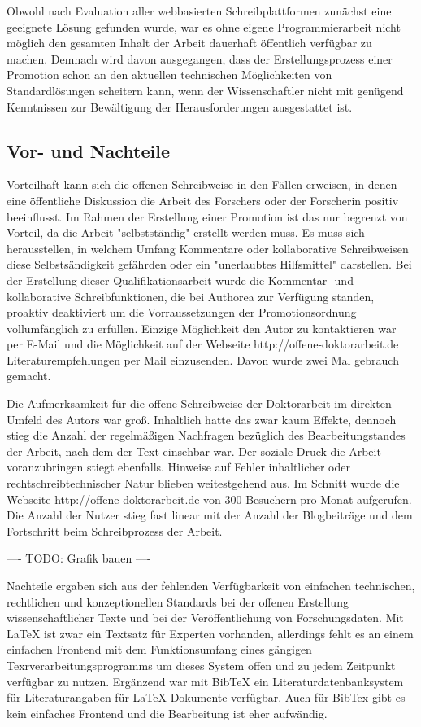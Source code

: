 Obwohl nach Evaluation aller webbasierten Schreibplattformen zunächst eine geeignete Lösung gefunden wurde, war es ohne eigene Programmierarbeit nicht möglich den gesamten Inhalt der Arbeit dauerhaft öffentlich verfügbar zu machen. Demnach wird davon ausgegangen, dass der Erstellungsprozess einer Promotion schon an den aktuellen technischen Möglichkeiten von Standardlösungen scheitern kann, wenn der Wissenschaftler nicht mit genügend Kenntnissen zur Bewältigung der Herausforderungen ausgestattet ist.

\subsection{Vor- und Nachteile}

Vorteilhaft kann sich die offenen Schreibweise in den Fällen erweisen, in denen eine öffentliche Diskussion die Arbeit des Forschers oder der Forscherin positiv beeinflusst. Im Rahmen der Erstellung einer Promotion ist das nur begrenzt von Vorteil, da die Arbeit "selbstständig" erstellt werden muss. Es muss sich herausstellen, in welchem Umfang Kommentare oder kollaborative Schreibweisen diese Selbstsändigkeit gefährden oder ein "unerlaubtes Hilfsmittel" darstellen. Bei der Erstellung dieser Qualifikationsarbeit wurde die Kommentar- und kollaborative Schreibfunktionen, die bei Authorea zur Verfügung standen, proaktiv deaktiviert um die Vorraussetzungen der Promotionsordnung vollumfänglich zu erfüllen. Einzige Möglichkeit den Autor zu kontaktieren war per E-Mail und die Möglichkeit auf der Webseite http://offene-doktorarbeit.de Literaturempfehlungen per Mail einzusenden. Davon wurde zwei Mal gebrauch gemacht.

Die Aufmerksamkeit für die offene Schreibweise der Doktorarbeit im direkten Umfeld des Autors war groß. Inhaltlich hatte das zwar kaum Effekte, dennoch stieg die Anzahl der regelmäßigen Nachfragen bezüglich des Bearbeitungstandes der Arbeit, nach dem der Text einsehbar war. Der soziale Druck die Arbeit voranzubringen stiegt ebenfalls. Hinweise auf Fehler inhaltlicher oder rechtschreibtechnischer Natur blieben weitestgehend aus. Im Schnitt wurde die Webseite http://offene-doktorarbeit.de von 300 Besuchern pro Monat aufgerufen. Die Anzahl der Nutzer stieg fast linear mit der Anzahl der Blogbeiträge und dem Fortschritt beim Schreibprozess der Arbeit.

---- TODO: Grafik bauen ----

Nachteile ergaben sich aus der fehlenden Verfügbarkeit von einfachen technischen, rechtlichen und konzeptionellen Standards bei der offenen Erstellung wissenschaftlicher Texte und bei der Veröffentlichung von Forschungsdaten. Mit LaTeX ist zwar ein Textsatz für Experten vorhanden, allerdings fehlt es an einem einfachen Frontend mit dem Funktionsumfang eines gängigen Texrverarbeitungsprogramms um dieses System offen und zu jedem Zeitpunkt verfügbar zu nutzen. Ergänzend war mit BibTeX ein Literaturdatenbanksystem für Literaturangaben für LaTeX-Dokumente verfügbar. Auch für BibTex gibt es kein einfaches Frontend und die Bearbeitung ist eher aufwändig.

